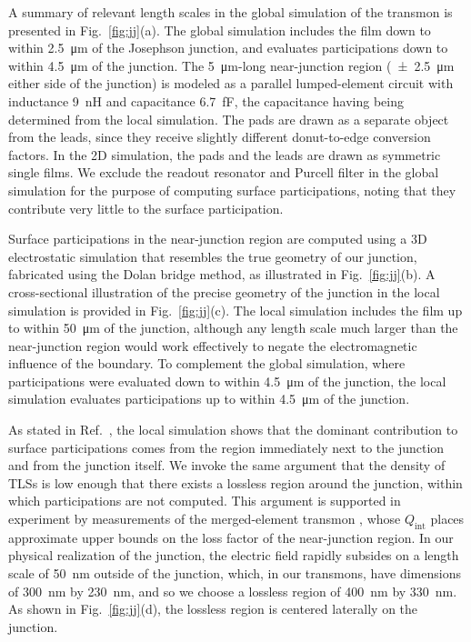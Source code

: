 \documentclass[
    reprint,
    superscriptaddress,
    amsmath,amssymb,
    aps,
    prb,
    floatfix,
]{revtex4-2}
\begin{document}
A summary of relevant length scales in the global simulation of the transmon is presented in Fig.~\ref{fig:jj}(a). The global simulation includes the film down to within \SI{2.5}{\micro\meter} of the Josephson junction, and evaluates participations down to within \SI{4.5}{\micro\meter} of the junction. The \SI{5}{\micro\meter}-long near-junction region (\SI{\pm2.5}{\micro\meter} either side of the junction) is modeled as a parallel lumped-element circuit with inductance \SI{9}{\nano\henry} and capacitance \SI{6.7}{\femto\farad}, the capacitance having being determined from the local simulation. The pads are drawn as a separate object from the leads, since they receive slightly different donut-to-edge conversion factors. In the 2D simulation, the pads and the leads are drawn as symmetric single films. We exclude the readout resonator and Purcell filter in the global simulation for the purpose of computing surface participations, noting that they contribute very little to the surface participation.

Surface participations in the near-junction region are computed using a 3D electrostatic simulation that resembles the true geometry of our junction, fabricated using the Dolan bridge method, as illustrated in Fig.~\ref{fig:jj}(b). A cross-sectional illustration of the precise geometry of the junction in the local simulation is provided in Fig.~\ref{fig:jj}(c). The local simulation includes the film up to within \SI{50}{\micro\meter} of the junction, although any length scale much larger than the near-junction region would work effectively to negate the electromagnetic influence of the boundary. To complement the global simulation, where participations were evaluated down to within \SI{4.5}{\micro\meter} of the junction, the local simulation evaluates participations up to within \SI{4.5}{\micro\meter} of the junction.

As stated in Ref.~\cite{wang2015}, the local simulation shows that the dominant contribution to surface participations comes from the region immediately next to the junction and from the junction itself. We invoke the same argument that the density of TLSs is low enough that there exists a lossless region around the junction, within which participations are not computed. This argument is supported in experiment by measurements of the merged-element transmon \cite{mamin2021}, whose $Q_\mathrm{int}$ places approximate upper bounds on the loss factor of the near-junction region. In our physical realization of the junction, the electric field rapidly subsides on a length scale of \SI{50}{\nano\meter} outside of the junction, which, in our transmons, have dimensions of \SI{300}{\nano\meter} by \SI{230}{\nano\meter}, and so we choose a lossless region of \SI{400}{\nano\meter} by \SI{330}{\nano\meter}. As shown in Fig.~\ref{fig:jj}(d), the lossless region is centered laterally on the junction.
\end{document}
